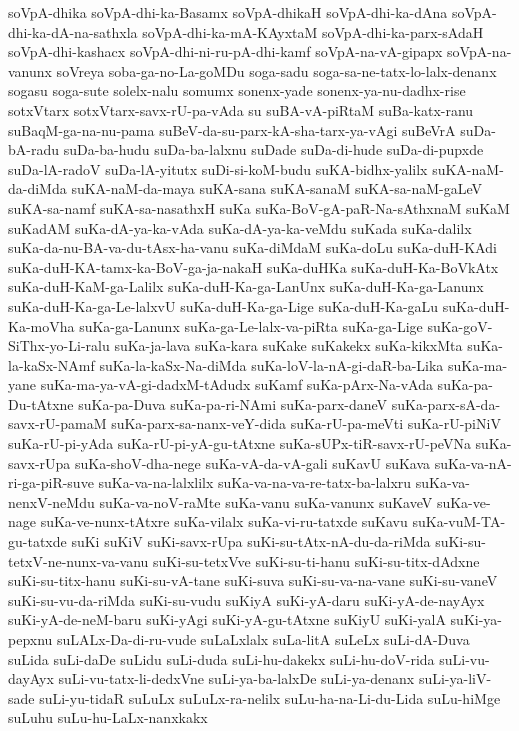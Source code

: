 {soVpA-dhika
soVpA-dhi-ka-Basamx
soVpA-dhikaH
soVpA-dhi-ka-dAna
soVpA-dhi-ka-dA-na-sathxla
soVpA-dhi-ka-mA-KAyxtaM
soVpA-dhi-ka-parx-sAdaH
soVpA-dhi-kashacx
soVpA-dhi-ni-ru-pA-dhi-kamf
soVpA-na-vA-gipapx
soVpA-na-vanunx
soVreya
soba-ga-no-La-goMDu
soga-sadu
soga-sa-ne-tatx-lo-lalx-denanx
sogasu
soga-sute
solelx-nalu
somumx
sonenx-yade
sonenx-ya-nu-dadhx-rise
sotxVtarx
sotxVtarx-savx-rU-pa-vAda
su
suBA-vA-piRtaM
suBa-katx-ranu
suBaqM-ga-na-nu-pama
suBeV-da-su-parx-kA-sha-tarx-ya-vAgi
suBeVrA
suDa-bA-radu
suDa-ba-hudu
suDa-ba-lalxnu
suDade
suDa-di-hude
suDa-di-pupxde
suDa-lA-radoV
suDa-lA-yitutx
suDi-si-koM-budu
suKA-bidhx-yalilx
suKA-naM-da-diMda
suKA-naM-da-maya
suKA-sana
suKA-sanaM
suKA-sa-naM-gaLeV
suKA-sa-namf
suKA-sa-nasathxH
suKa
suKa-BoV-gA-paR-Na-sAthxnaM
suKaM
suKadAM
suKa-dA-ya-ka-vAda
suKa-dA-ya-ka-veMdu
suKada
suKa-dalilx
suKa-da-nu-BA-va-du-tAsx-ha-vanu
suKa-diMdaM
suKa-doLu
suKa-duH-KAdi
suKa-duH-KA-tamx-ka-BoV-ga-ja-nakaH
suKa-duHKa
suKa-duH-Ka-BoVkAtx
suKa-duH-KaM-ga-Lalilx
suKa-duH-Ka-ga-LanUnx
suKa-duH-Ka-ga-Lanunx
suKa-duH-Ka-ga-Le-lalxvU
suKa-duH-Ka-ga-Lige
suKa-duH-Ka-gaLu
suKa-duH-Ka-moVha
suKa-ga-Lanunx
suKa-ga-Le-lalx-va-piRta
suKa-ga-Lige
suKa-goV-SiThx-yo-Li-ralu
suKa-ja-lava
suKa-kara
suKake
suKakekx
suKa-kikxMta
suKa-la-kaSx-NAmf
suKa-la-kaSx-Na-diMda
suKa-loV-la-nA-gi-daR-ba-Lika
suKa-ma-yane
suKa-ma-ya-vA-gi-dadxM-tAdudx
suKamf
suKa-pArx-Na-vAda
suKa-pa-Du-tAtxne
suKa-pa-Duva
suKa-pa-ri-NAmi
suKa-parx-daneV
suKa-parx-sA-da-savx-rU-pamaM
suKa-parx-sa-nanx-veY-dida
suKa-rU-pa-meVti
suKa-rU-piNiV
suKa-rU-pi-yAda
suKa-rU-pi-yA-gu-tAtxne
suKa-sUPx-tiR-savx-rU-peVNa
suKa-savx-rUpa
suKa-shoV-dha-nege
suKa-vA-da-vA-gali
suKavU
suKava
suKa-va-nA-ri-ga-piR-suve
suKa-va-na-lalxlilx
suKa-va-na-va-re-tatx-ba-lalxru
suKa-va-nenxV-neMdu
suKa-va-noV-raMte
suKa-vanu
suKa-vanunx
suKaveV
suKa-ve-nage
suKa-ve-nunx-tAtxre
suKa-vilalx
suKa-vi-ru-tatxde
suKavu
suKa-vuM-TA-gu-tatxde
suKi
suKiV
suKi-savx-rUpa
suKi-su-tAtx-nA-du-da-riMda
suKi-su-tetxV-ne-nunx-va-vanu
suKi-su-tetxVve
suKi-su-ti-hanu
suKi-su-titx-dAdxne
suKi-su-titx-hanu
suKi-su-vA-tane
suKi-suva
suKi-su-va-na-vane
suKi-su-vaneV
suKi-su-vu-da-riMda
suKi-su-vudu
suKiyA
suKi-yA-daru
suKi-yA-de-nayAyx
suKi-yA-de-neM-baru
suKi-yAgi
suKi-yA-gu-tAtxne
suKiyU
suKi-yalA
suKi-ya-pepxnu
suLALx-Da-di-ru-vude
suLaLxlalx
suLa-litA
suLeLx
suLi-dA-Duva
suLida
suLi-daDe
suLidu
suLi-duda
suLi-hu-dakekx
suLi-hu-doV-rida
suLi-vu-dayAyx
suLi-vu-tatx-li-dedxVne
suLi-ya-ba-lalxDe
suLi-ya-denanx
suLi-ya-liV-sade
suLi-yu-tidaR
suLuLx
suLuLx-ra-nelilx
suLu-ha-na-Li-du-Lida
suLu-hiMge
suLuhu
suLu-hu-LaLx-nanxkakx
}
